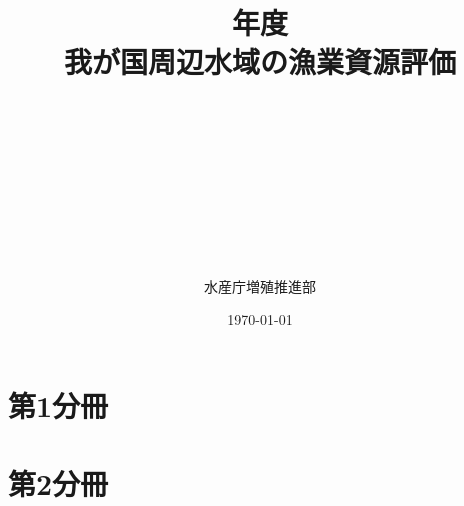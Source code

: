 \documentclass[A4j, disablejfam, titlepage, openright, twoside, 10.5pt, dvipdfmx, report, uplatex]{myjsbook}
\begin{document}
\frontmatter

\title{
{\thisyrjp}年度
\\
{\HUGE 我が国周辺水域の漁業資源評価}}
\author{\\
\\
\\
\\
\\
\\
\\
\\
\\
{\Large 水産庁増殖推進部}
\\
}
\date{\today}
\maketitle
%
\mainmatter
\part*{第1分冊}

\tableofcontents




\part*{第2分冊}



\end{document}
